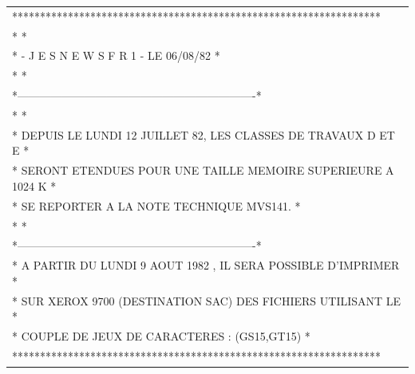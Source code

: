 {}
{\scriptsize\ttfamily\begin{tabular}{l}
******************************************************************\\
* *\\
* - J E S N E W S F R 1 - LE 06/08/82 *\\
* *\\
*----------------------------------------------------------------*\\
* *\\
* DEPUIS LE LUNDI 12 JUILLET 82, LES CLASSES DE TRAVAUX D ET E *\\
* SERONT ETENDUES POUR UNE TAILLE MEMOIRE SUPERIEURE A 1024 K *\\
* SE REPORTER A LA NOTE TECHNIQUE MVS141. *\\
* *\\
*----------------------------------------------------------------*\\
* A PARTIR DU LUNDI 9 AOUT 1982 , IL SERA POSSIBLE D'IMPRIMER *\\
* SUR XEROX 9700 (DESTINATION SAC) DES FICHIERS UTILISANT LE *\\
* COUPLE DE JEUX DE CARACTERES : (GS15,GT15) *\\
******************************************************************\\
\end{tabular}}

